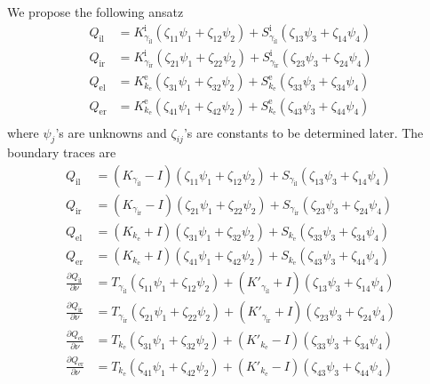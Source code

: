 We propose the following ansatz 
\begin{align*}
  Q_\text{il} &= K_{\gamma_\text{il}}^{\text{i}} (\zeta_{11}\psi_1 + \zeta_{12}\psi_2) + S_{\gamma_\text{il}}^{\text{i}} (\zeta_{13} \psi_3 + \zeta_{14}\psi_4) \\
  Q_\text{ir} &= K_{\gamma_\text{ir}}^{\text{i}} (\zeta_{21}\psi_1 + \zeta_{22}\psi_2) + S_{\gamma_\text{ir}}^{\text{i}} (\zeta_{23} \psi_3 + \zeta_{24}\psi_4) \\
  Q_\text{el} &= K_{k_\text{e}}^{\text{e}} (\zeta_{31}\psi_1 + \zeta_{32}\psi_2) + S_{k_\text{e}}^{\text{e}} (\zeta_{33} \psi_3 + \zeta_{34}\psi_4) \\
  Q_\text{er} &= K_{k_\text{e}}^{\text{e}} (\zeta_{41}\psi_1 + \zeta_{42}\psi_2) + S_{k_\text{e}}^{\text{e}} (\zeta_{43} \psi_3 + \zeta_{44}\psi_4) \\
\end{align*}
where $\psi_j$'s are unknowns and $\zeta_{ij}$'s are constants to be determined later. The boundary traces are 
\begin{align*}
  Q_\text{il} &= (K_{\gamma_\text{il}}-I) (\zeta_{11}\psi_1 + \zeta_{12}\psi_2) + S_{\gamma_\text{il}} (\zeta_{13} \psi_3 + \zeta_{14}\psi_4) \\
  Q_\text{ir} &= (K_{\gamma_\text{ir}}-I) (\zeta_{21}\psi_1 + \zeta_{22}\psi_2) + S_{\gamma_\text{ir}} (\zeta_{23} \psi_3 + \zeta_{24}\psi_4) \\
  Q_\text{el} &= (K_{k_\text{e}} + I) (\zeta_{31}\psi_1 + \zeta_{32}\psi_2) + S_{k_\text{e}} (\zeta_{33} \psi_3 + \zeta_{34}\psi_4) \\
  Q_\text{er} &= (K_{k_\text{e}} + I) (\zeta_{41}\psi_1 + \zeta_{42}\psi_2) + S_{k_\text{e}} (\zeta_{43} \psi_3 + \zeta_{44}\psi_4) \\
  \frac{\partial Q_\text{il}}{\partial\nu} &= T_{\gamma_\text{il}} (\zeta_{11}\psi_1 + \zeta_{12}\psi_2) + (K'_{\gamma_\text{il}} + I) (\zeta_{13} \psi_3 + \zeta_{14}\psi_4)\\
  \frac{\partial Q_\text{ir}}{\partial\nu} &= T_{\gamma_\text{ir}} (\zeta_{21}\psi_1 + \zeta_{22}\psi_2) + (K'_{\gamma_\text{ir}} + I) (\zeta_{23} \psi_3 + \zeta_{24}\psi_4)\\
  \frac{\partial Q_\text{el}}{\partial\nu} &= T_{k_\text{e}} (\zeta_{31}\psi_1 + \zeta_{32}\psi_2) + (K'_{k_\text{e}} - I) (\zeta_{33} \psi_3 + \zeta_{34}\psi_4)\\
  \frac{\partial Q_\text{er}}{\partial\nu} &= T_{k_\text{e}} (\zeta_{41}\psi_1 + \zeta_{42}\psi_2) + (K'_{k_\text{e}} - I) (\zeta_{43} \psi_3 + \zeta_{44}\psi_4)\\
\end{align*}
